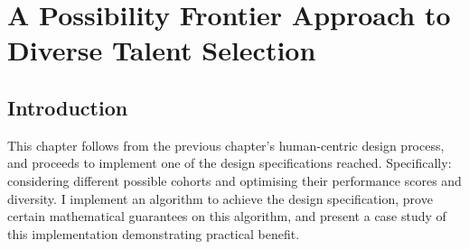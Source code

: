 

\chapter{\label{ch:spf}A Possibility Frontier Approach to Diverse Talent Selection} %

\minitoc

\section{Introduction}

This chapter follows from the previous chapter’s human-centric design process, and proceeds to implement one of the design specifications reached. Specifically: considering different possible cohorts and optimising their performance scores and diversity. I implement an algorithm to achieve the design specification, prove certain mathematical guarantees on this algorithm, and present a case study of this implementation demonstrating practical benefit.

